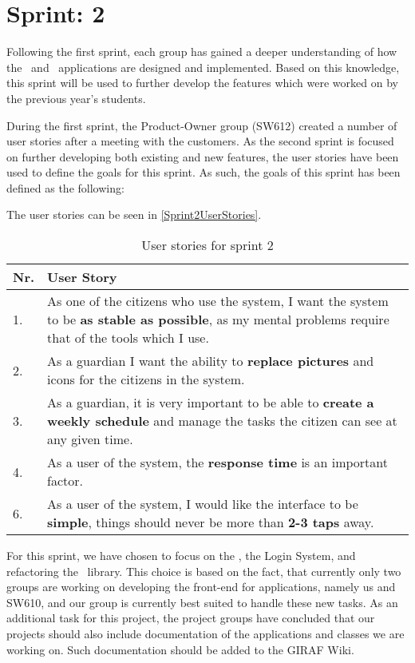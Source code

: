 \chapter{Sprint: 2}
Following the first sprint, each group has gained a deeper understanding of how
the \lapp\ and \wapp\ applications are designed and implemented. Based on this
knowledge, this sprint will be used to further develop the features which were
worked on by the previous year's students.\nl

During the first sprint, the Product-Owner group (SW612) created a number of
user stories after a meeting with the customers. As the second sprint is focused
on further developing both existing and new features, the user stories have been
used to define the goals for this sprint. As such, the goals of this sprint has
been defined as the following:\nl

\nl

The user stories can be seen in \autoref{Sprint2UserStories}.

\begin{table}[H]
\centering 
\begin{tabular}{|l|p{12.5cm}|}
\hline
Nr. & User Story \\\hline
1. & As one of the citizens who use the system, I want the system to be 
\textbf{as stable as possible}, as my mental problems require that of the tools
which I use. \\ \hline
2. & As a guardian I want the ability to \textbf{replace pictures} and icons
for the citizens in the system.\\ \hline
3. & As a guardian, it is very important to be able to \textbf{create a weekly
schedule} and manage the tasks the citizen can see at any given time.\\ \hline
4. & As a user of the system, the \textbf{response time} is an important
factor.\\ \hline
6. & As a user of the system, I would like the interface to be \textbf{simple},
things should never be more than \textbf{2-3 taps} away. \\\hline
\end{tabular}
\caption{User stories for sprint 2}
\label{Sprint2UserStories}
\end{table}

For this sprint, we have chosen to focus on the \lapp, the Login System,
and refactoring the \plib\ library. This choice is based on the fact,
that currently only two groups are working on developing the front-end for
applications, namely us and SW610, and our group is currently best suited to
handle these new tasks. As an additional task for this project, the project
groups have concluded that our projects should also include documentation of
the applications and classes we are working on. Such documentation should be
added to the GIRAF Wiki.

